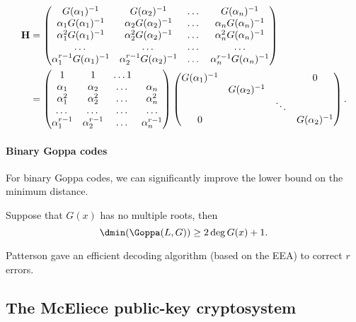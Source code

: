 \documentclass[a4paper, 11pt, openany]{book}
\begin{document}
\begin{align*}
	{\bf H} &= \begin{pmatrix}
		G(\alpha_1)^{-1} & G(\alpha_2)^{-1} & \dots & G(\alpha_n)^{-1}\\
		\alpha_1 G(\alpha_1)^{-1} & \alpha_2 G(\alpha_2)^{-1} & \dots & \alpha_n G(\alpha_n)^{-1}\\
		\alpha_1^2 G(\alpha_1)^{-1} & \alpha_2^2 G(\alpha_2)^{-1} & \dots & \alpha_n^2 G(\alpha_n)^{-1}\\
		\dots & \dots & \dots & \dots\\
		\alpha_1^{r-1} G(\alpha_1)^{-1} & \alpha_2^{r-1} G(\alpha_2)^{-1} & \dots & \alpha_n^{r-1} G(\alpha_n)^{-1}
	\end{pmatrix}\\
	&= \begin{pmatrix}
			1 & 1 & \dots 1\\
			\alpha_1 & \alpha_2 & \dots & \alpha_n \\
			\alpha_1^2 & \alpha_2^2 & \dots & \alpha_n^2 \\
			\dots & \dots & \dots & \dots\\
			\alpha_1^{r-1} & \alpha_2^{r-1} & \dots & \alpha_n^{r-1}
		\end{pmatrix}
		\begin{pmatrix}
		G(\alpha_1)^{-1} 	&  		& 		& 0		\\
		 		& G(\alpha_2)^{-1} 	& 		&  		\\
				&		& \ddots& 		\\
		0		&		&		&G(\alpha_2)^{-1}
		\end{pmatrix}.
\end{align*}



\paragraph{Binary Goppa codes}

For binary Goppa codes, we can significantly improve the lower bound on the minimum distance.

\begin{theorem}
Suppose that $G(x)$ has no multiple roots, then
\[
	\dmin(\Goppa (L,G) ) \ge 2 \deg G(x) + 1.
\]
\end{theorem}
Patterson gave an efficient decoding algorithm (based on the EEA) to correct $r$ errors.





\subsection{The McEliece public-key cryptosystem}
\end{document}
